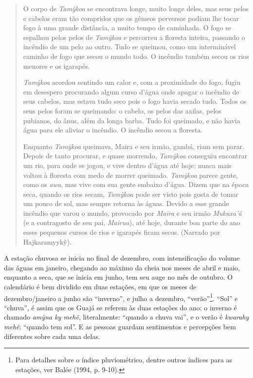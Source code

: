 \begin{quote}
O corpo de \emph{Tamỹkoa} se encontrava longe, muito longe deles, mas
seus pelos e cabelos eram tão compridos que os gêmeos perversos podiam
lhe tocar fogo à uma grande distância, a muito tempo de caminhada. O
fogo se espalhou pelos pelos de \emph{Tamỹkoa} e percorreu a floresta
inteira, passando o incêndio de um pelo ao outro. Tudo se queimou, como
um interminável caminho de fogo que secou o mundo todo. O incêndio
também secou os rios menores e os igarapés.

\emph{Tamỹkoa} acordou sentindo um calor e, com a proximidade do fogo,
fugiu em desespero procurando algum curso d'água onde apagar o incêndio
de seus cabelos, mas estava tudo seco pois o fogo havia secado tudo.
Todos os seus pelos foram se queimando: o cabelo, os pelos das axilas,
pelos pubianos, do ânus, além da longa barba. Tudo foi queimado, e não
havia água para ele aliviar o incêndio. O incêndio secou a floresta.

Enquanto \emph{Tamỹkoa} queimava, Maira e seu irmão, gambá, riam sem
parar. Depois de tanto procurar, e quase morrendo, \emph{Tamỹkoa}
conseguiu encontrar um rio, para onde se jogou, e vive dentro d'água até
hoje; nunca mais voltou à floresta com medo de morrer queimado.
\emph{Tamỹkoa} parece gente, como os \emph{awa}, mas vive com sua gente
embaixo d'água. Dizem que na época seca, quando os rios secam,
\emph{Tamỹkoa} pode ser visto pois gosta de tomar um pouco de sol, mas
sempre retorna às águas. Devido a esse grande incêndio que varou o
mundo, provocado por \emph{Maira} e seu irmão \emph{Mukuxa'á} (e a
contragosto de seu pai, \emph{Mairua}), até hoje, durante boa parte do
ano esses pequenos cursos de rios e igarapés ficam secos. (Narrado por
Hajkaramyykỹ).
\end{quote}

A estação chuvosa se inicia no final de dezembro, com intensificação do
volume das águas em janeiro, chegando ao máximo da cheia nos meses de
abril e maio, enquanto a seca, que se inicia em junho, tem seu auge no
mês de outubro. O calendário é bem dividido em duas estações, em que os
meses de dezembro/janeiro a junho são ``inverno'', e julho a dezembro,
``verão''\footnote{Para detalhes sobre o índice pluviométrico, dentre
  outros índices para as estações, ver Balée (1994, p. 9-10).}. ``Sol''
e ``chuva'', é assim que os Guajá se referem às duas estações do ano: o
inverno é chamado \emph{amỹna ky mehẽ}, literalmente: ``quando a chuva
vai'', e o verão é \emph{kwarahy mehẽ}: ``quando tem sol''. E as pessoas
guardam sentimentos e percepções bem diferentes sobre cada uma delas.

